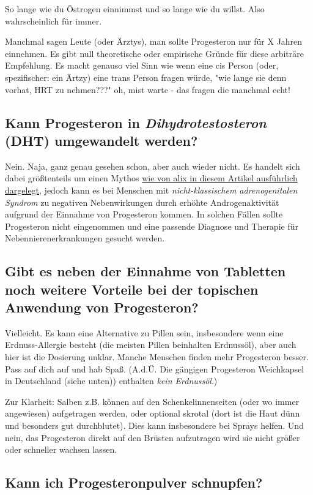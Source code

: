\documentclass{article}
\begin{document}
So lange wie du Östrogen einnimmst und so lange wie du willst. Also wahrscheinlich für immer.

Manchmal sagen Leute (oder Ärztys), man sollte Progesteron nur für X Jahren einnehmen. Es gibt null theoretische oder empirische Gründe für diese arbiträre Empfehlung. Es macht genauso viel Sinn wie wenn eine cis Person (oder, spezifischer: ein Ärtzy) eine trans Person fragen würde, "wie lange sie denn vorhat, HRT zu nehmen???" \textemdash{} oh, mist warte - das fragen die manchmal echt!

\subsection{Kann Progesteron in \textit{Dihydrotestosteron} (DHT) umgewandelt werden?}

Nein. Naja, ganz genau gesehen schon, aber auch wieder nicht. Es handelt sich dabei größtenteils um einen Mythos \href{https://whsah.co/posts/rethinking-progesterone-and-androgens/}{wie von alix in diesem Artikel ausführlich dargelegt}, jedoch kann es bei Menschen mit \textit{nicht-klassischem adrenogenitalen Syndrom} zu negativen Nebenwirkungen durch erhöhte Androgenaktivität aufgrund der Einnahme von Progesteron kommen. In solchen Fällen sollte Progesteron nicht eingenommen und eine passende Diagnose und Therapie für Nebennierenerkrankungen gesucht werden.

\subsection{Gibt es neben der Einnahme von Tabletten noch weitere Vorteile bei der topischen Anwendung von Progesteron?}

Vielleicht. Es kann eine Alternative zu Pillen sein, insbesondere wenn eine Erdnuss-Allergie besteht (die meisten Pillen beinhalten Erdnussöl), aber auch hier ist die Dosierung unklar. Manche Menschen finden mehr Progesteron besser. Pass auf dich auf und hab Spaß. (A.d.Ü. Die gängigen Progesteron Weichkapsel in Deutschland (siehe unten)) enthalten \textit{kein Erdnussöl}.)

Zur Klarheit: Salben z.B. können auf den Schenkelinnenseiten (oder wo immer angewiesen) aufgetragen werden, oder optional skrotal (dort ist die Haut dünn und besonders gut durchblutet). Dies kann insbesondere bei Sprays helfen. Und nein, das Progesteron direkt auf den Brüsten aufzutragen wird sie nicht größer oder schneller wachsen lassen. 

\subsection{Kann ich Progesteronpulver schnupfen?}
\end{document}
